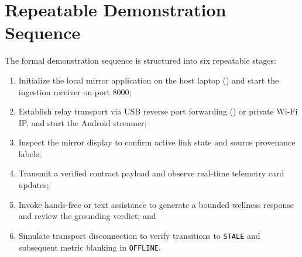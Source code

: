 \section{Repeatable Demonstration Sequence}
The formal demonstration sequence is structured into six repeatable stages:
\begin{enumerate}[noitemsep,topsep=1pt]
  \item Initialize the local mirror application on the host laptop () and start the ingestion receiver on port 8000;
  \item Establish relay transport via USB reverse port forwarding () or private Wi-Fi IP, and start the Android streamer;
  \item Inspect the mirror display to confirm active link state and source provenance labels;
  \item Transmit a verified contract payload and observe real-time telemetry card updates;
  \item Invoke hands-free or text assistance to generate a bounded wellness response and review the grounding verdict; and
  \item Simulate transport disconnection to verify transitions to \texttt{STALE} and subsequent metric blanking in \texttt{OFFLINE}.
\end{enumerate}
